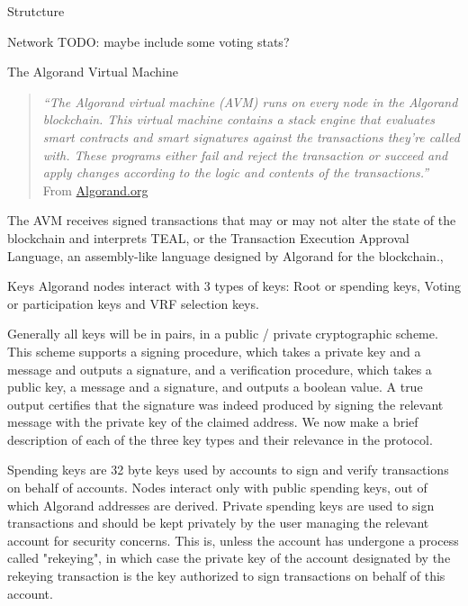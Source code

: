 \documentclass[10pt,a4paper]{article}
\begin{document}
\begin{section}{Strutcture}
\begin{subsection}{Network}
TODO: maybe include some voting stats?

\end{subsection}
\begin{subsection}{The Algorand Virtual Machine}\label{sect:avm}
    
    \begin{quote} 
        {\em``The Algorand virtual machine (AVM) runs on every node in the Algorand blockchain. 
    This virtual machine contains a stack engine that evaluates smart contracts and smart 
    signatures against the transactions they're called with. These programs either fail 
    and reject the transaction or succeed and apply changes according to the logic and 
    contents of the transactions.''} From \href{https://developer.algorand.org/docs/get-details/dapps/avm/}{Algorand.org}
    \end{quote}
    
The AVM receives signed transactions that may or may not alter the 
state of the blockchain and interprets TEAL, or the Transaction Execution 
Approval Language, an assembly-like language designed by Algorand 
for the blockchain.,

\end{subsection}
\begin{subsection}{Keys}
    Algorand nodes interact with 3 types of keys:
    Root or spending keys,
    Voting or participation keys and
    VRF selection keys.

    Generally all keys will be in pairs, in a public / private cryptographic scheme.
    This scheme supports a signing procedure, which takes a private key and a message and outputs a signature, 
    and a verification procedure, which takes a public key, a message and a signature, and outputs a boolean value.
    A true output certifies that the signature was indeed produced by signing the relevant message with the private key of the 
    claimed address.
    We now make a brief description of each of the three key types and their relevance in the protocol.


    Spending keys are 32 byte keys used by accounts to sign and verify transactions
    on behalf of accounts. Nodes interact only with public spending keys, out of which
    Algorand addresses are derived. Private spending keys are used to sign transactions
    and should be kept privately by the user managing the relevant account for security
    concerns. This is, unless the account has undergone a process called "rekeying", in which case 
    the private key of the account designated by the rekeying transaction is the key authorized 
    to sign transactions on behalf of this account.


\end{subsection}
\end{section}
\end{document}
